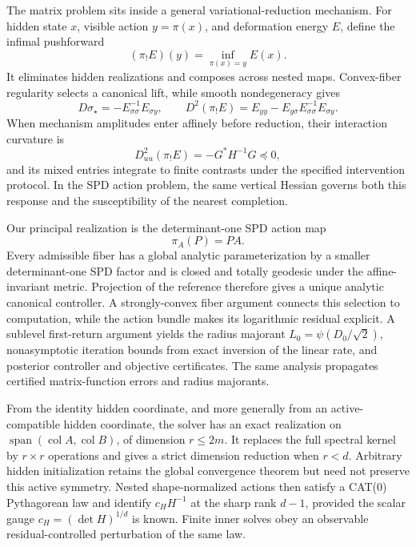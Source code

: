The matrix problem sits inside a general variational-reduction mechanism.  For
hidden state \(x\), visible action \(y=\pi(x)\), and deformation energy \(E\),
define the infimal pushforward
\[
  (\pi_!E)(y)=\inf_{\pi(x)=y}E(x).
\]
It eliminates hidden realizations and composes across nested maps.
Convex-fiber regularity selects a canonical lift, while smooth nondegeneracy
gives
\[
  D\sigma_\star=-E_{\sigma\sigma}^{-1}E_{\sigma y},
  \qquad
  D^2(\pi_!E)
  =E_{yy}-E_{y\sigma}E_{\sigma\sigma}^{-1}E_{\sigma y}.
\]
When mechanism amplitudes enter affinely before reduction, their interaction
curvature is
\[
  D^2_{uu}(\pi_!E)=-G^*H^{-1}G\preceq0,
\]
and its mixed entries integrate to finite contrasts under the specified
intervention protocol.  In the SPD action problem, the same vertical Hessian
governs both this response and the susceptibility of the nearest completion.

Our principal realization is the determinant-one SPD action map
\[
  \pi_A(P)=PA.
\]
Every admissible fiber has a global analytic parameterization by a smaller
determinant-one SPD factor and is closed and totally geodesic under the
affine-invariant metric.  Projection of the reference therefore gives a unique
analytic canonical controller.  A strongly-convex fiber argument connects
this selection to computation, while the action bundle makes its logarithmic
residual explicit.  A sublevel first-return argument yields the radius
majorant \(L_0=\psi(D_0/\sqrt2)\), nonasymptotic iteration bounds from exact
inversion of the linear rate, and posterior controller and objective
certificates.  The same analysis propagates certified matrix-function errors
and radius majorants.

From the identity hidden coordinate, and more generally from an
active-compatible hidden coordinate, the solver has an exact realization on
\(\operatorname{span}(\operatorname{col}A,\operatorname{col}B)\), of dimension
\(r\le2m\).  It replaces the full spectral kernel by \(r\times r\) operations
and gives a strict dimension reduction when \(r<d\).  Arbitrary hidden
initialization retains the global convergence theorem but need not preserve
this active symmetry.  Nested shape-normalized actions then satisfy a CAT(0)
Pythagorean law and identify \(c_HH^{-1}\) at the sharp rank \(d-1\), provided
the scalar gauge \(c_H=(\det H)^{1/d}\) is known.  Finite inner solves obey an
observable residual-controlled perturbation of the same law.


